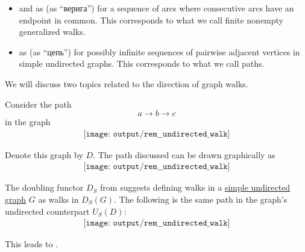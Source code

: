 \begin{remark}
\begin{thmenum}
\begin{itemize}
      \item {} and  as (as \enquote{верига}) for a sequence of arcs where consecutive arcs have an endpoint in common. This corresponds to what we call finite nonempty generalized walks.

      \item {} as (as \enquote{цепь}) for possibly infinite sequences of pairwise adjacent vertices in simple undirected graphs. This corresponds to what we call paths.
    \end{itemize}
  \end{thmenum}
\end{remark}

\begin{remark}\label{rem:undirected_walks}
  We will discuss two topics related to the direction of graph walks.

  Consider the path
  \begin{equation*}
    a \to b \to c
  \end{equation*}
  in the graph
  \begin{equation*}
    \begin{aligned}
      \texttt{[image: output/rem\_\_undirected\_walk]}
    \end{aligned}
  \end{equation*}

  Denote this graph by \( D \). The path discussed can be drawn graphically as
  \begin{equation*}
    \begin{aligned}
      \texttt{[image: output/rem\_\_undirected\_walk]}
    \end{aligned}
  \end{equation*}

  The doubling functor \( D_S \) from  suggests defining walks in a \hyperref[def:undirected_graph]{simple undirected graph} \( G \) as walks in \( D_S(G) \). The following is the same path in the graph's undirected counterpart \hyperref[def:graph_functors/simple_forgetful]{\( U_S(D) \)}:
  \begin{equation*}
    \begin{aligned}
      \texttt{[image: output/rem\_\_undirected\_walk]}
    \end{aligned}
  \end{equation*}

  This leads to .


\end{remark}
